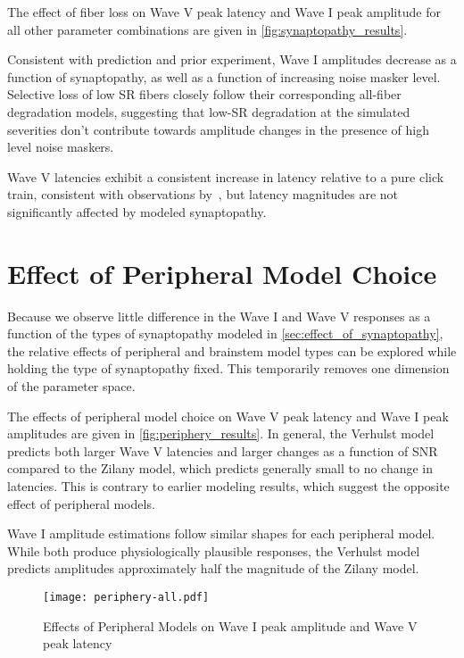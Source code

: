 The effect of fiber loss on Wave V peak latency and Wave I peak amplitude for all other parameter combinations are given in \autoref{fig:synaptopathy_results}.  

Consistent with prediction and prior experiment, Wave I amplitudes decrease as a function of synaptopathy, as well as a function of increasing noise masker level.  Selective loss of low SR fibers closely follow their corresponding all-fiber degradation models, suggesting that low-SR degradation at the simulated severities don't contribute towards amplitude changes in the presence of high level noise maskers. 

Wave V latencies exhibit a consistent increase in latency relative to a pure click train,  consistent with observations by~\cite{Mehraei2016Auditory}, but latency magnitudes are not significantly affected by modeled synaptopathy. 

\section{Effect of Peripheral Model Choice} %
\label{sec:effect_of_peripheral_model}
Because we observe little difference in the Wave I and Wave V responses as a function of the types of synaptopathy modeled in \autoref{sec:effect_of_synaptopathy}, the relative effects of peripheral and brainstem model types can be explored while holding the type of synaptopathy fixed.  This temporarily removes one dimension of the parameter space. 

The effects of peripheral model choice on Wave V peak latency and Wave I peak amplitudes are given in \autoref{fig:periphery_results}.   In general, the Verhulst model predicts both larger Wave V latencies and larger changes as a function of SNR compared to the Zilany model, which predicts generally small to no change in latencies.  This is contrary to earlier modeling results, which suggest the opposite effect of peripheral models. 

Wave I amplitude estimations follow similar shapes for each peripheral model.  While both produce physiologically plausible responses, the Verhulst model predicts amplitudes approximately half the magnitude of the Zilany model. 

\begin{figure}[htbp]
	\centering
	\texttt{[image: periphery-all.pdf]}
	\caption[Effects of Peripheral Models]{Effects of Peripheral Models on Wave I peak amplitude and Wave V peak latency}
	\label{fig:periphery_results}
\end{figure}

